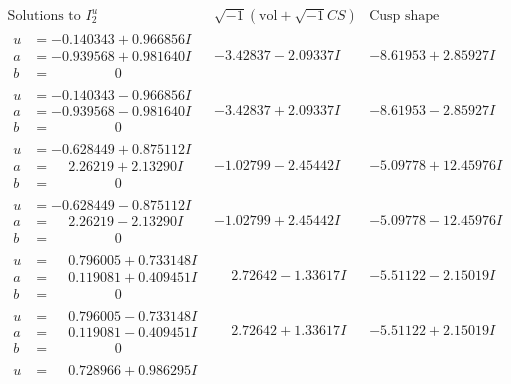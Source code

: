 \documentclass[1p]{elsarticle_modified}
\theoremstyle{definition}
\newcommand{\I}{\sqrt{-1}}
\begin{document}
$$\begin{array}{c|c|c}  
\text{Solutions to }I^u_{2}& \I (\text{vol} + \sqrt{-1}CS) & \text{Cusp shape}\\
 \hline 
\begin{aligned}
u &= -0.140343 + 0.966856 I \\
a &= -0.939568 + 0.981640 I \\
b &= \phantom{-0.000000 } 0\end{aligned}
 & -3.42837 - 2.09337 I & -8.61953 + 2.85927 I \\ \hline\begin{aligned}
u &= -0.140343 - 0.966856 I \\
a &= -0.939568 - 0.981640 I \\
b &= \phantom{-0.000000 } 0\end{aligned}
 & -3.42837 + 2.09337 I & -8.61953 - 2.85927 I \\ \hline\begin{aligned}
u &= -0.628449 + 0.875112 I \\
a &= \phantom{-}2.26219 + 2.13290 I \\
b &= \phantom{-0.000000 } 0\end{aligned}
 & -1.02799 - 2.45442 I & -5.09778 + 12.45976 I \\ \hline\begin{aligned}
u &= -0.628449 - 0.875112 I \\
a &= \phantom{-}2.26219 - 2.13290 I \\
b &= \phantom{-0.000000 } 0\end{aligned}
 & -1.02799 + 2.45442 I & -5.09778 - 12.45976 I \\ \hline\begin{aligned}
u &= \phantom{-}0.796005 + 0.733148 I \\
a &= \phantom{-}0.119081 + 0.409451 I \\
b &= \phantom{-0.000000 } 0\end{aligned}
 & \phantom{-}2.72642 - 1.33617 I & -5.51122 - 2.15019 I \\ \hline\begin{aligned}
u &= \phantom{-}0.796005 - 0.733148 I \\
a &= \phantom{-}0.119081 - 0.409451 I \\
b &= \phantom{-0.000000 } 0\end{aligned}
 & \phantom{-}2.72642 + 1.33617 I & -5.51122 + 2.15019 I \\ \hline\begin{aligned}
u &= \phantom{-}0.728966 + 0.986295 I \\

\end{aligned}
\end{array}$$
\end{document}
